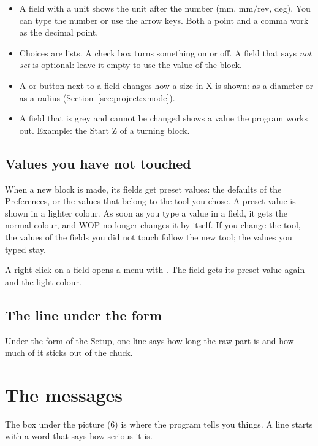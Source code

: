 \begin{itemize}
\item A field with a unit shows the unit after the number (mm, mm/rev, deg). You can type the number or use the arrow keys. Both a point and a comma work as the decimal point.
\item Choices are lists. A check box turns something on or off. A field that says \emph{not set} is optional: leave it empty to use the value of the block.
\item A  or  button next to a field changes how a size in X is shown: as a diameter or as a radius (Section~\ref{sec:project:xmode}).
\item A field that is grey and cannot be changed shows a value the program works out. Example: the Start Z of a turning block.
\end{itemize}

\subsection{Values you have not touched}
When a new block is made, its fields get preset values: the defaults of the Preferences, or the values that belong to the tool you chose. A preset value is shown in a lighter colour. As soon as you type a value in a field, it gets the normal colour, and WOP no longer changes it by itself. If you change the tool, the values of the fields you did not touch follow the new tool; the values you typed stay.

A right click on a field opens a menu with . The field gets its preset value again and the light colour.

\subsection{The line under the form}
Under the form of the Setup, one line says how long the raw part is and how much of it sticks out of the chuck.

\section{The messages}\label{sec:window:messages}

The box under the picture (6) is where the program tells you things. A line starts with a word that says how serious it is.

